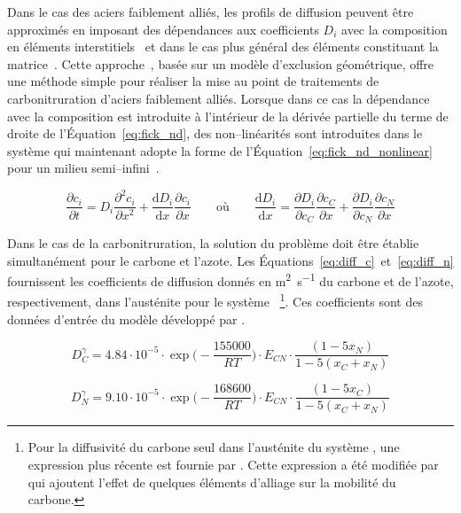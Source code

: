 Dans le cas des aciers faiblement alliés, les profils de diffusion peuvent être approximés en imposant des dépendances aux coefficients $D_{i}$ avec la composition en éléments interstitiels~\cite{Slycke1981ii} et dans le cas plus général des éléments constituant la matrice~\cite{Borgenstam2000,Lee2011}. Cette approche~\cite{Slycke1981ii}, basée sur un modèle d'exclusion géométrique,  offre une méthode simple pour réaliser la mise au point de traitements de carbonitruration d'aciers faiblement alliés. Lorsque dans ce cas la dépendance avec la composition est introduite à l'intérieur de la dérivée partielle du terme de droite de l'Équation~\ref{eq:fick_nd}, des non--linéarités sont introduites dans le système qui maintenant adopte la forme de l'Équation~\ref{eq:fick_nd_nonlinear} pour un milieu semi--infini~\citep{Mehrer2007}.

\begin{equation}
  \frac{\partial c_{i}}{\partial t}=
  D_{i}\frac{\partial^{2}c_{i}}{\partial x^{2}}+
  \frac{\mathrm{d}D_{i}}{\mathrm{d}x}\frac{\partial c_{i}}{\partial x}
  \qquad\text{où}\qquad
  \frac{\mathrm{d}D_{i}}{\mathrm{d}x}=
  \frac{\partial D_{i}}{\partial c_{C}}\frac{\partial c_{C}}{\partial x}+
  \frac{\partial D_{i}}{\partial c_{N}}\frac{\partial c_{N}}{\partial x}
  \label{eq:fick_nd_nonlinear}
\end{equation}

Dans le cas de la carbonitruration, la solution du problème doit être établie simultanément pour le carbone et l'azote. Les Équations~\ref{eq:diff_c}~et~\ref{eq:diff_n} fournissent les coefficients de diffusion \textendash{} donnés en \si{\square\metre\per\second} \textendash{} du carbone et de l'azote, respectivement, dans l'austénite pour le système ~\footnote{Pour la diffusivité du carbone seul dans l'austénite du système , une expression plus récente est fournie par \citet{Agren1986}. Cette expression a été modifiée par \citet{Lee2011} qui ajoutent l'effet de quelques éléments d'alliage sur la mobilité du carbone.}. Ces coefficients sont des données d'entrée du modèle développé par \citet{Slycke1981ii}.

\begin{equation}
  D_{C}^{\gamma}=4.84\cdot10^{-5}\cdot
  \exp\biggr(-\frac{155000}{RT}\biggr)\cdot E_{CN}\cdot
  \frac{\left(1-5x_{N}\right)}{1-5\left(x_{C}+x_{N}\right)}
  \label{eq:diff_c}
\end{equation}

\begin{equation}
  D_{N}^{\gamma}=9.10\cdot10^{-5}\cdot
  \exp\biggr(-\frac{168600}{RT}\biggr)\cdot E_{CN}\cdot
  \frac{\left(1-5x_{C}\right)}{1-5\left(x_{C}+x_{N}\right)}
  \label{eq:diff_n}
\end{equation}

